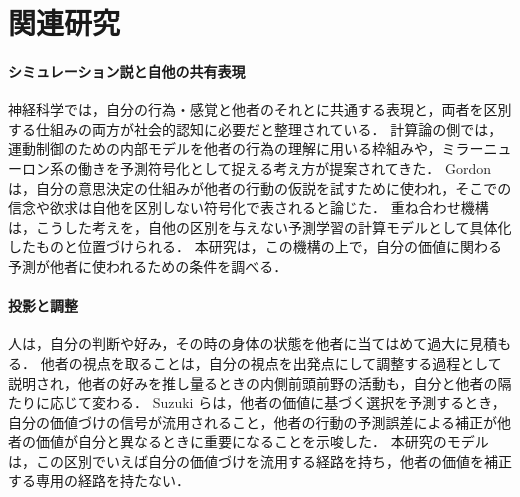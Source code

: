 \section{関連研究}\label{sec:related}

\paragraph{シミュレーション説と自他の共有表現}
神経科学では，自分の行為・感覚と他者のそれとに共通する表現と，両者を区別する仕組みの両方が社会的認知に必要だと整理されている\cite{decety2003shared}．
計算論の側では，運動制御のための内部モデルを他者の行為の理解に用いる枠組み\cite{wolpert2003unifying}や，ミラーニューロン系の働きを予測符号化として捉える考え方\cite{kilner2007predictive}が提案されてきた．
Gordon\cite{gordon2021simulation}は，自分の意思決定の仕組みが他者の行動の仮説を試すために使われ，そこでの信念や欲求は自他を区別しない符号化で表されると論じた．
重ね合わせ機構\cite{noguchi2022superposition}は，こうした考えを，自他の区別を与えない予測学習の計算モデルとして具体化したものと位置づけられる．
本研究は，この機構の上で，自分の価値に関わる予測が他者に使われるための条件を調べる．

\paragraph{投影と調整}
人は，自分の判断や好み，その時の身体の状態を他者に当てはめて過大に見積もる\cite{ross1977false,nickerson1999how,vanboven2003social}．
他者の視点を取ることは，自分の視点を出発点にして調整する過程として説明され\cite{epley2004perspective}，他者の好みを推し量るときの内側前頭前野の活動も，自分と他者の隔たりに応じて変わる\cite{tamir2010neural}．
Suzuki ら\cite{suzuki2012learning}は，他者の価値に基づく選択を予測するとき，自分の価値づけの信号が流用されること，他者の行動の予測誤差による補正が他者の価値が自分と異なるときに重要になることを示唆した．
本研究のモデルは，この区別でいえば自分の価値づけを流用する経路を持ち，他者の価値を補正する専用の経路を持たない．

